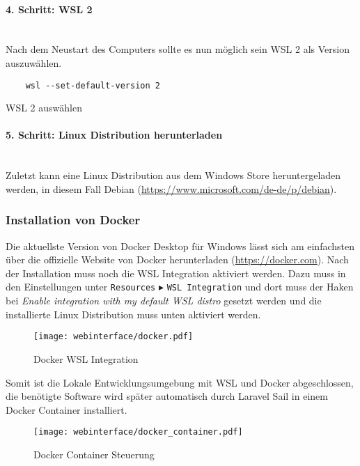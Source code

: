 \paragraph{4. Schritt: WSL 2}\mbox{}\\
Nach dem Neustart des Computers sollte es nun möglich sein WSL 2 als Version
auszuwählen.
\begin{listing}[H]
  \begin{verbatim}
    wsl --set-default-version 2
  \end{verbatim}
  \caption{WSL 2 auswählen}
\end{listing}

\paragraph{5. Schritt: Linux Distribution herunterladen}\mbox{}\\
Zuletzt kann eine Linux Distribution aus dem Windows Store heruntergeladen
werden, in diesem Fall Debian (\url{https://www.microsoft.com/de-de/p/debian}).


\subsubsection{Installation von Docker}
Die aktuellste Version von Docker Desktop für Windows lässt sich am einfachsten
über die offizielle Website von Docker herunterladen (\url{https://docker.com}).
Nach der Installation muss noch die WSL Integration aktiviert werden. Dazu muss
in den Einstellungen unter \verb|Resources| $\blacktriangleright$ \verb|WSL Integration|
und dort muss der Haken bei \textit{Enable integration with my default WSL distro}
gesetzt werden und die installierte Linux Distribution muss unten aktiviert
werden.

\begin{figure}[H]
  \centering
  \texttt{[image: webinterface/docker.pdf]}
  \caption{Docker WSL Integration}
\end{figure}

Somit ist die Lokale Entwicklungsumgebung mit WSL und Docker abgeschlossen, die
benötigte Software wird später automatisch durch Laravel Sail in einem Docker
Container installiert.

\begin{figure}[H]
  \centering
  \texttt{[image: webinterface/docker\_container.pdf]}
  \caption{Docker Container Steuerung}
\end{figure}

